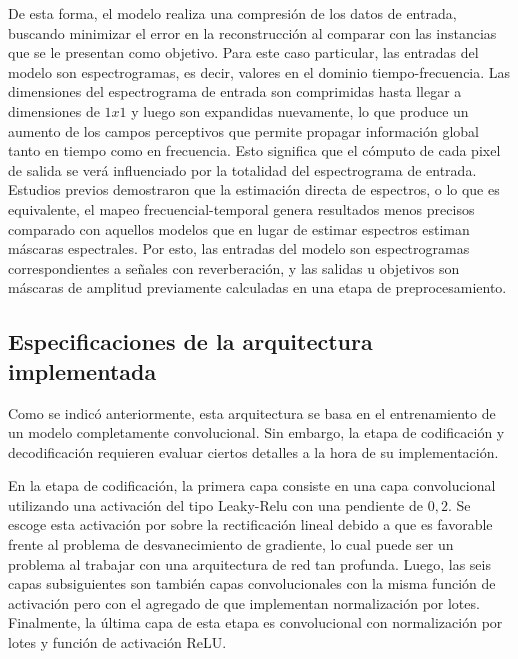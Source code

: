 De esta forma, el modelo realiza una compresión de los datos de entrada, buscando minimizar el error en la reconstrucción al comparar con las instancias que se le presentan como objetivo. 
Para este caso particular, las entradas del modelo son espectrogramas, es decir, valores en el dominio tiempo-frecuencia. Las dimensiones del espectrograma de entrada son comprimidas hasta llegar a dimensiones de $1x1$ y luego son expandidas nuevamente, lo que produce un aumento de los campos perceptivos que permite propagar información global tanto en tiempo como en frecuencia. Esto significa que el cómputo de cada pixel de salida se verá influenciado por la totalidad del espectrograma de entrada. Estudios previos demostraron que la estimación directa de espectros, o lo que es equivalente, el mapeo frecuencial-temporal genera resultados menos precisos comparado con aquellos modelos que en lugar de estimar espectros estiman máscaras espectrales\cite{mask_vs_map}. Por esto, las entradas del modelo son espectrogramas correspondientes a señales con reverberación, y las salidas u objetivos son máscaras de amplitud previamente calculadas en una etapa de preprocesamiento. 

\subsection{Especificaciones de la arquitectura implementada}

Como se indicó anteriormente, esta arquitectura se basa en el entrenamiento de un modelo completamente convolucional. Sin embargo, la etapa de codificación y decodificación requieren evaluar ciertos detalles a la hora de su implementación. 

En la etapa de codificación, la primera capa consiste en una capa convolucional utilizando una activación del tipo Leaky-Relu con una pendiente de $0,2$. Se escoge esta activación por sobre la rectificación lineal debido a que es favorable frente al problema de desvanecimiento de gradiente, lo cual puede ser un problema al trabajar con una arquitectura de red tan profunda. Luego, las seis capas subsiguientes son también capas convolucionales con la misma función de activación pero con el agregado de que implementan normalización por lotes. Finalmente, la última capa de esta etapa es convolucional con normalización por lotes y función de activación ReLU. 

